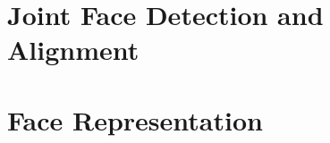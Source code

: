 \documentclass[class=report, crop=false, a4paper, 12pt]{standalone}
\begin{document}
\section{Joint Face Detection and Alignment}
\section{Face Representation}
\end{document}
